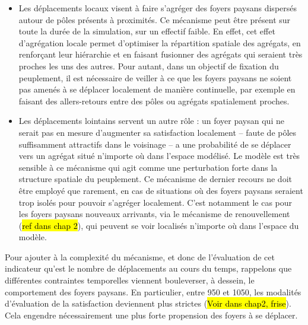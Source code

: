 \begin{itemize}
	\item Les déplacements locaux visent à faire s'agréger des foyers paysans dispersés autour de pôles présents à proximités.
	Ce mécanisme peut être présent sur toute la durée de la simulation, sur un effectif faible.
	En effet, cet effet d'agrégation locale permet \og d'optimiser\fg{} la répartition spatiale des agrégats, en renforçant leur hiérarchie et en faisant fusionner des agrégats qui seraient très proches les uns des autres.
	Pour autant, dans un objectif de fixation du peuplement, il est nécessaire de veiller à ce que les foyers paysans ne soient pas amenés à se déplacer localement de manière continuelle, par exemple en faisant des allers-retours entre des pôles ou agrégats spatialement proches.
	
	\item Les déplacements lointains servent un autre rôle :
un foyer paysan qui ne serait pas en mesure d'augmenter sa satisfaction localement -- faute de pôles suffisamment attractifs dans le voisinage -- a une probabilité de se déplacer vers un agrégat situé n'importe où dans l'espace modélisé.
	Le modèle est très sensible à ce mécanisme qui agit comme une perturbation forte dans la structure spatiale du peuplement.
	Ce mécanisme \og de dernier recours\fg{} ne doit être employé que rarement, en cas de situations où des foyers paysans seraient trop isolés pour pouvoir s'agréger localement.
	C'est notamment le cas pour les foyers paysans nouveaux arrivants, via le mécanisme de renouvellement (\hl{ref dans chap 2}), qui peuvent se voir localisés n'importe où dans l'espace du modèle.
\end{itemize}

Pour ajouter à la complexité du mécanisme, et donc de l'évaluation de cet indicateur qu'est le nombre de déplacements au cours du temps, rappelons que différentes contraintes temporelles viennent bouleverser, à dessein, le comportement des foyers paysans.
En particulier, entre 950 et 1050, les modalités d'évaluation de la satisfaction deviennent plus strictes (\hl{Voir dans chap2, frise}).
Cela engendre nécessairement une plus forte propension des foyers à se déplacer.

